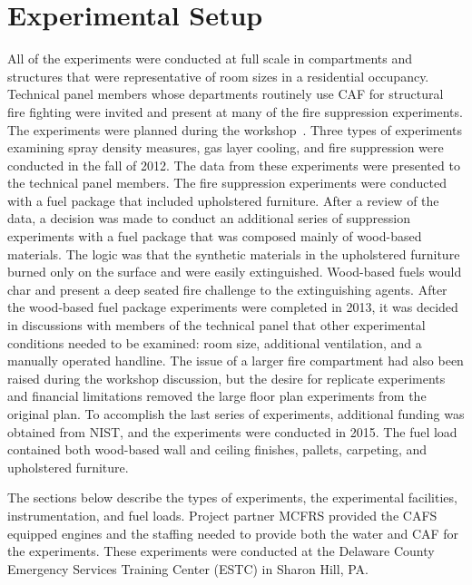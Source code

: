 \documentclass[12pt,oneside]{book}
\begin{document}
\chapter{Experimental Setup}

All of the experiments were conducted at full scale in compartments and structures that were representative of room sizes in a residential occupancy. Technical panel members whose departments routinely use CAF for structural fire fighting were invited and present at many of the fire suppression experiments. The experiments were planned during the workshop~\cite{Grant:2011}. Three types of experiments examining spray density measures, gas layer cooling, and fire suppression were conducted in the fall of 2012. The data from these experiments were presented to the technical panel members. The fire suppression experiments were conducted with a fuel package that included upholstered furniture. After a review of the data, a decision was made to conduct an additional series of suppression experiments with a fuel package that was composed mainly of wood-based materials. The logic was that the synthetic materials in the upholstered furniture burned only on the surface and were easily extinguished. Wood-based fuels would char and present a deep seated fire challenge to the extinguishing agents.  After the wood-based fuel package experiments were completed in 2013, it was decided in discussions with members of the technical panel that other experimental conditions needed to be examined: room size, additional ventilation, and a manually operated handline. The issue of a larger fire compartment had also been raised during the workshop discussion, but the desire for replicate experiments and financial limitations removed the large floor plan experiments from the original plan. To accomplish the last series of experiments, additional funding was obtained from NIST, and the experiments were conducted in 2015. The fuel load contained both wood-based wall and ceiling finishes, pallets, carpeting, and upholstered furniture.  

The sections below describe the types of experiments, the experimental facilities, instrumentation, and fuel loads. Project partner MCFRS provided the CAFS equipped engines and the staffing needed to provide both the water and CAF for the experiments. These experiments were conducted at the Delaware County Emergency Services Training Center (ESTC) in Sharon Hill, PA.
\end{document}
